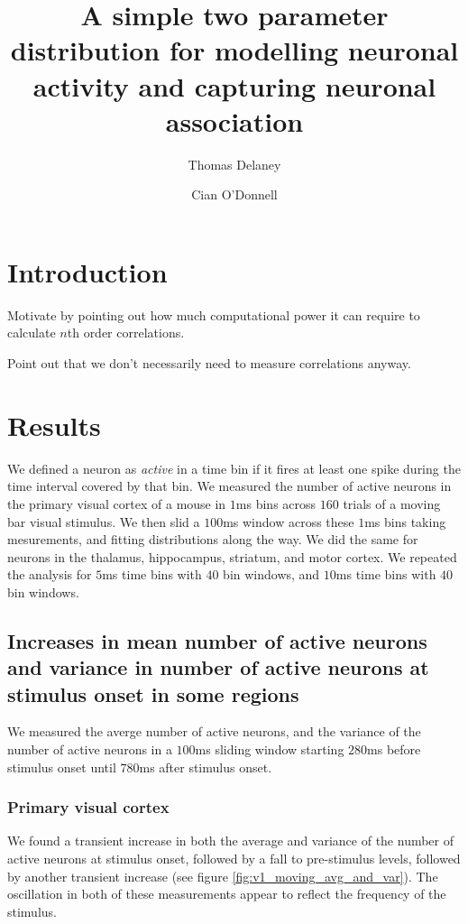 \documentclass[a4paper,12pt]{article}
\title{A simple two parameter distribution for modelling neuronal activity and capturing neuronal association}
\date{}
\author[1]{Thomas Delaney}
\author[1]{Cian O'Donnell}
\affil[1]{School of Computer Science, Electrical and Electronic Engineering, and Engineering Mathematics, University of Bristol, Bristol, United Kingdom.}
\theoremstyle{definition}
\begin{document}
\maketitle



\section{Introduction}
  Motivate by pointing out how much computational power it can require to calculate $n$th order correlations.

  Point out that we don't necessarily need to measure correlations anyway.

\section{Results}
We defined a neuron as \textit{active} in a time bin if it fires at least one spike during the time interval covered by that bin. We measured the number of active neurons in the primary visual cortex of a mouse in $1$ms bins across $160$ trials of a moving bar visual stimulus. We then slid a $100$ms window across these $1$ms bins taking mesurements, and fitting distributions along the way. We did the same for neurons in the thalamus, hippocampus, striatum, and motor cortex. We repeated the analysis for $5$ms time bins with $40$ bin windows, and $10$ms time bins with $40$ bin windows.

  \subsection{Increases in mean number of active neurons and variance in number of active neurons at stimulus onset in some regions}
  We measured the averge number of active neurons, and the variance of the number of active neurons in a $100$ms sliding window starting $280$ms before stimulus onset until $780$ms after stimulus onset.

    \subsubsection{Primary visual cortex}
    We found a transient increase in both the average and variance of the number of active neurons at stimulus onset, followed by a fall to pre-stimulus levels, followed by another transient increase (see figure \ref{fig:v1_moving_avg_and_var}). The oscillation in both of these measurements appear to reflect the frequency of the stimulus.
\end{document}
